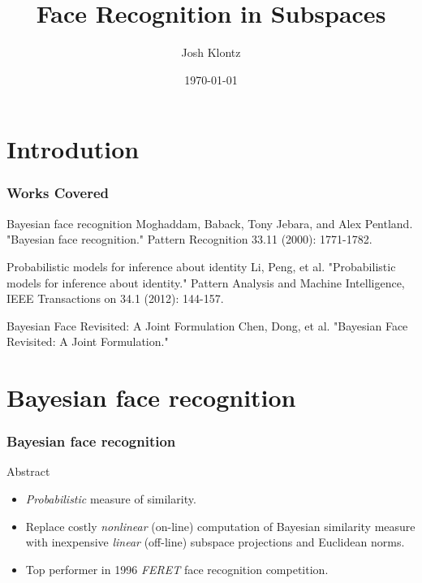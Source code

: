 \documentclass{beamer}
\title[Subspaces]{Face Recognition in Subspaces}
\author{Josh Klontz}
\date{\today}
\begin{document}
\begin{frame}
\titlepage
\end{frame}

\section{Introdution}
\begin{frame}
\frametitle{Works Covered}
\begin{block}{Bayesian face recognition}
Moghaddam, Baback, Tony Jebara, and Alex Pentland. "Bayesian face recognition." Pattern Recognition 33.11 (2000): 1771-1782.
\end{block}
\pause
\begin{block}{Probabilistic models for inference about identity}
Li, Peng, et al. "Probabilistic models for inference about identity." Pattern Analysis and Machine Intelligence, IEEE Transactions on 34.1 (2012): 144-157.
\end{block}
\pause
\begin{block}{Bayesian Face Revisited: A Joint Formulation}
Chen, Dong, et al. "Bayesian Face Revisited: A Joint Formulation."
\end{block}
\end{frame}

\section{Bayesian face recognition}
\begin{frame}
\frametitle{Bayesian face recognition}
\begin{block}{Abstract}
\begin{itemize}
\item \emph{Probabilistic} measure of similarity.
\pause
\item Replace costly \emph{nonlinear} (on-line) computation of Bayesian similarity measure with inexpensive \emph{linear} (off-line) subspace projections and Euclidean norms.
\pause
\item Top performer in 1996 \emph{FERET} face recognition competition.
\end{itemize}
\end{block}
\end{frame}
\end{document}
